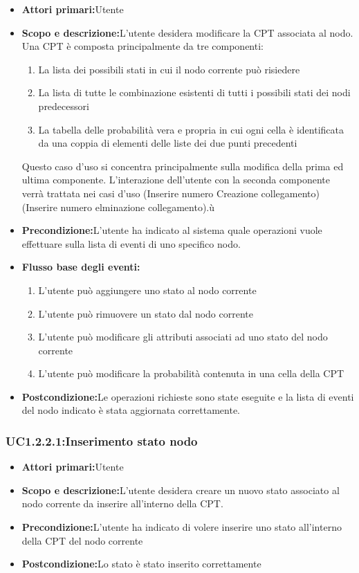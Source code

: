 \begin{itemize}
	\item{\textbf{Attori primari:}Utente}
	\item{\textbf{Scopo e descrizione:}L'utente desidera modificare la CPT associata al nodo. Una CPT è composta principalmente da tre componenti:
	\begin{enumerate}
		\item{La lista dei possibili stati in cui il nodo corrente può risiedere}
		\item{La lista di tutte le combinazione esistenti di tutti i possibili stati dei nodi predecessori}
		\item{La tabella delle probabilità vera e propria in cui ogni cella è identificata da una coppia di elementi delle liste dei due punti precedenti}
	\end{enumerate}
	Questo caso d'uso si concentra principalmente sulla modifica della prima ed ultima componente. L'interazione dell'utente con la seconda componente verrà trattata nei casi d'uso (Inserire numero Creazione collegamento)(Inserire numero elminazione collegamento).ù
}
	\item{\textbf{Precondizione:}L'utente ha indicato al sistema quale operazioni vuole effettuare sulla lista di eventi di uno specifico nodo.}
	\item{\textbf{Flusso base degli eventi:}}
	\begin{enumerate}
		\item{L'utente può aggiungere uno stato al nodo corrente}
		\item{L'utente può rimuovere un stato dal nodo corrente}
		\item{L'utente può modificare gli attributi associati ad uno stato del nodo corrente}
		\item{L'utente può modificare la probabilità contenuta in una cella della CPT}
	\end{enumerate}
	\item{\textbf{Postcondizione:}Le operazioni richieste sono state eseguite e la lista di eventi del nodo indicato è stata aggiornata correttamente.}
\end{itemize}
\subsubsection{UC1.2.2.1:Inserimento stato nodo}
\begin{itemize}
	\item{\textbf{Attori primari:}Utente}
	\item{\textbf{Scopo e descrizione:}L'utente desidera creare un nuovo stato associato al nodo corrente da inserire all'interno della CPT.}
	\item{\textbf{Precondizione:}L'utente ha indicato di volere inserire uno stato all'interno della CPT del nodo corrente}
	\item{\textbf{Postcondizione:}Lo stato è stato inserito correttamente}
\end{itemize}
